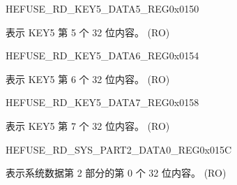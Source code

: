 \begin{register}{H}{EFUSE\_RD\_KEY5\_DATA5\_REG}{0x0150}\label{regdesc:EFUSERDKEY5DATA5REG}
%
\regnewline%
\begin{regdesc}\begin{reglist}
\label{fielddesc:EFUSEKEY5DATA5}\item [EFUSE\_KEY5\_DATA5] 表示 KEY5 第 5 个 32 位内容。 (RO)
\end{reglist}\end{regdesc}
\end{register}


\begin{register}{H}{EFUSE\_RD\_KEY5\_DATA6\_REG}{0x0154}\label{regdesc:EFUSERDKEY5DATA6REG}
%
\regnewline%
\begin{regdesc}\begin{reglist}
\label{fielddesc:EFUSEKEY5DATA6}\item [EFUSE\_KEY5\_DATA6] 表示 KEY5 第 6 个 32 位内容。 (RO)
\end{reglist}\end{regdesc}
\end{register}


\begin{register}{H}{EFUSE\_RD\_KEY5\_DATA7\_REG}{0x0158}\label{regdesc:EFUSERDKEY5DATA7REG}
%
\regnewline%
\begin{regdesc}\begin{reglist}
\label{fielddesc:EFUSEKEY5DATA7}\item [EFUSE\_KEY5\_DATA7] 表示 KEY5 第 7 个 32 位内容。 (RO)
\end{reglist}\end{regdesc}
\end{register}


\begin{register}{H}{EFUSE\_RD\_SYS\_PART2\_DATA0\_REG}{0x015C}\label{regdesc:EFUSERDSYSPART2DATA0REG}
%
\regnewline%
\begin{regdesc}\begin{reglist}
\label{fielddesc:EFUSESYSDATAPART20}\item [EFUSE\_SYS\_DATA\_PART2\_0] 表示系统数据第 2 部分的第 0 个 32 位内容。 (RO)
\end{reglist}\end{regdesc}
\end{register}


